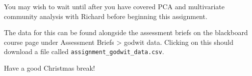 \documentclass[
]{book}
\begin{document}
You may wish to wait until after you have covered PCA and multivariate community analysis with Richard before beginning this assignment.

The data for this can be found alongside the assessment briefs on the blackboard course page under Assessment Briefs \textgreater{} godwit data. Clicking on this should download a file called \texttt{assignment\_godwit\_data.csv}.

Have a good Christmas break!

  
\end{document}
